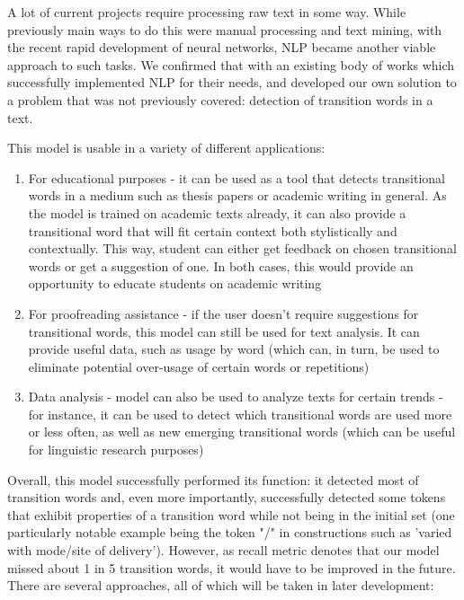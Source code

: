 \documentclass[conference]{IEEEtran}
\begin{document}
A lot of current projects require processing raw text in some way. While previously main ways to do this were manual processing and text mining, with the recent rapid development of neural networks, NLP became another viable approach to such tasks. We confirmed that with an existing body of works which successfully implemented NLP for their needs, and developed our own solution to a problem that was not previously covered: detection of transition words in a text.

This model is usable in a variety of different applications:
\begin{enumerate}
    \item For educational purposes - it can be used as a tool that detects transitional words in a medium such as thesis papers or academic writing in general. As the model is trained on academic texts already, it can also provide a transitional word that will fit certain context both stylistically and contextually. This way, student can either get feedback on chosen transitional words or get a suggestion of one. In both cases, this would provide an opportunity to educate students on academic writing
    \item For proofreading assistance - if the user doesn't require suggestions for transitional words, this model can still be used for text analysis. It can provide useful data, such as usage by word (which can, in turn, be used to eliminate potential over-usage of certain words or repetitions)
    \item Data analysis - model can also be used to analyze texts for certain trends - for instance, it can be used to detect which transitional words are used more or less often, as well as new emerging transitional words (which can be useful for linguistic research purposes)
\end{enumerate}

Overall, this model successfully performed its function: it detected most of transition words and, even more importantly, successfully detected some tokens that exhibit properties of a transition word while not being in the initial set (one particularly notable example being the token "/" in constructions such as 'varied with mode/site of delivery'). However, as recall metric denotes that our model missed about 1 in 5 transition words, it would have to be improved in the future. There are several approaches, all of which will be taken in later development:
\end{document}
